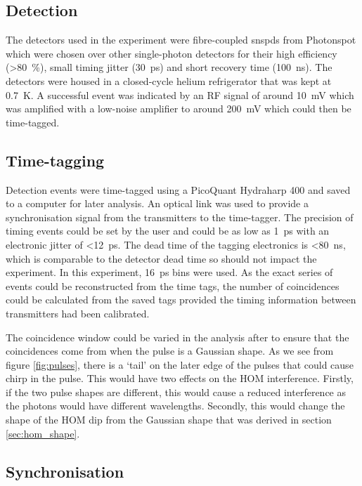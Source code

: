 \subsection{Detection}

The detectors used in the experiment were fibre-coupled \acp{snspd} from Photonspot which were chosen over other single-photon detectors for their high efficiency (\SI{>80}{\percent}), small timing jitter (\SI{30}{\ps}) and short recovery time (\SI{100}{\ns}). The detectors were housed in a closed-cycle helium refrigerator that was kept at \SI{0.7}{K}. A successful event was indicated by an RF signal of around \SI{10}{\mV} which was amplified with a low-noise amplifier to around \SI{200}{\mV} which could then be time-tagged.

\subsection{Time-tagging}

Detection events were time-tagged using a PicoQuant Hydraharp 400 and saved to a computer for later analysis. An optical link was used to provide a synchronisation signal from the transmitters to the time-tagger. The precision of timing events could be set by the user and could be as low as \SI{1}{\ps} with an electronic jitter of \SI{<12}{\ps}. The dead time of the tagging electronics is \SI{<80}{\ns}, which is comparable to the detector dead time so should not impact the experiment. In this experiment, \SI{16}{\ps} bins were used. As the exact series of events could be reconstructed from the time tags, the number of coincidences could be calculated from the saved tags provided the timing information between transmitters had been calibrated.

The coincidence window could be varied in the analysis after to ensure that the coincidences come from when the pulse is a Gaussian shape. As we see from figure \ref{fig:pulses}, there is a `tail' on the later edge of the pulses that could cause chirp in the pulse. This would have two effects on the \ac{HOM} interference. Firstly, if the two pulse shapes are different, this would cause a reduced interference as the photons would have different wavelengths. Secondly, this would change the shape of the \ac{HOM} dip from the Gaussian shape that was derived in section \ref{sec:hom_shape}.

\subsection{Synchronisation}

